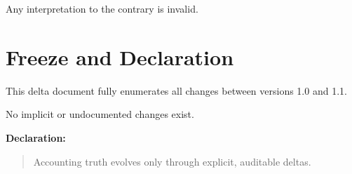 \documentclass[11pt]{article}
\newcommand{\OldVersion}{1.0}
\newcommand{\NewVersion}{1.1}
\begin{document}
Any interpretation to the contrary is invalid.

\section*{Freeze and Declaration}

This delta document fully enumerates all changes between versions
\OldVersion{} and \NewVersion{}.

No implicit or undocumented changes exist.

\vspace{1em}

\noindent
\textbf{Declaration:}
\begin{quote}
Accounting truth evolves only through explicit, auditable deltas.
\end{quote}
\end{document}
